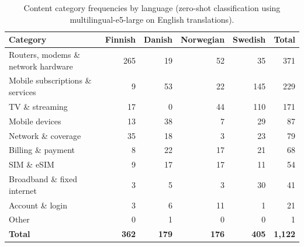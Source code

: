 \begin{table}[t]
\centering
\caption{Content category frequencies by language (zero-shot classification using multilingual-e5-large on English translations).}
\label{tab:categories}
\begin{tabular}{lrrrrr}
\toprule
\textbf{Category} & \textbf{Finnish} & \textbf{Danish} & \textbf{Norwegian} & \textbf{Swedish} & \textbf{Total} \\
\midrule
Routers, modems \& network hardware & 265 & 19 & 52 & 35 & 371 \\
Mobile subscriptions \& services & 9 & 53 & 22 & 145 & 229 \\
TV \& streaming & 17 & 0 & 44 & 110 & 171 \\
Mobile devices & 13 & 38 & 7 & 29 & 87 \\
Network \& coverage & 35 & 18 & 3 & 23 & 79 \\
Billing \& payment & 8 & 22 & 17 & 21 & 68 \\
SIM \& eSIM & 9 & 17 & 17 & 11 & 54 \\
Broadband \& fixed internet & 3 & 5 & 3 & 30 & 41 \\
Account \& login & 3 & 6 & 11 & 1 & 21 \\
Other & 0 & 1 & 0 & 0 & 1 \\
\midrule
\textbf{Total} & \textbf{362} & \textbf{179} & \textbf{176} & \textbf{405} & \textbf{1{,}122} \\
\bottomrule
\end{tabular}
\end{table}
